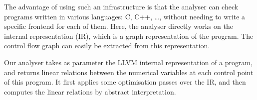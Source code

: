 \documentclass[a4paper,english,titlepage,11pt]{report}
\begin{document}
\begin{figure}[!h]
\end{figure}
\FloatBarrier

The advantage of using such an infrastructure is that the analyser can check
programs written in various languages: C, C++, \dots, without needing to write
a specific frontend for each of them. Here, the analyser directly works on the
internal representation (IR), which is a graph representation of
the program. The control flow graph can easily be extracted from
this representation.

Our analyser takes as parameter the LLVM internal representation of a program,
and returns linear relations between the numerical variables at each control
point of this program. It first applies some optimisation passes over the IR,
and then computes the linear relations by abstract interpretation.
\end{document}
